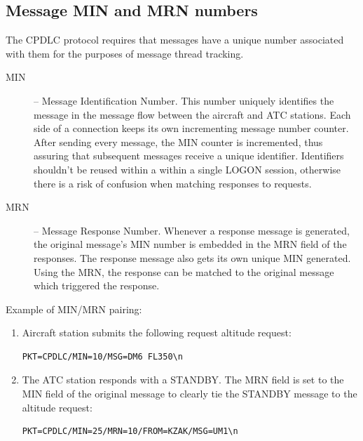 \documentclass[a4paper,12pt]{article}
\begin{document}
\subsection{Message MIN and MRN numbers}
\label{MinMrn}

The CPDLC protocol requires that messages have a unique number associated
with them for the purposes of message thread tracking.

\begin{description}

\item[MIN] -- Message Identification Number. This number uniquely
identifies the message in the message flow between the aircraft and ATC
stations. Each side of a connection keeps its own incrementing message
number counter. After sending every message, the MIN counter is
incremented, thus assuring that subsequent messages receive a unique
identifier. Identifiers shouldn't be reused within a within a single
LOGON session, otherwise there is a risk of confusion when matching
responses to requests.

\item[MRN] -- Message Response Number. Whenever a response message is
generated, the original message's MIN number is embedded in the MRN field
of the responses. The response message also gets its own unique MIN
generated. Using the MRN, the response can be matched to the original
message which triggered the response.

\end{description}

\noindent Example of MIN/MRN pairing:

\begin{enumerate}

\item Aircraft station submits the following request altitude request:

\begin{verbatim}
PKT=CPDLC/MIN=10/MSG=DM6 FL350\n
\end{verbatim}

\item The ATC station responds with a STANDBY. The MRN field is set
to the MIN field of the original message to clearly tie the STANDBY
message to the altitude request:

\begin{verbatim}
PKT=CPDLC/MIN=25/MRN=10/FROM=KZAK/MSG=UM1\n
\end{verbatim}

\end{enumerate}
\end{document}
